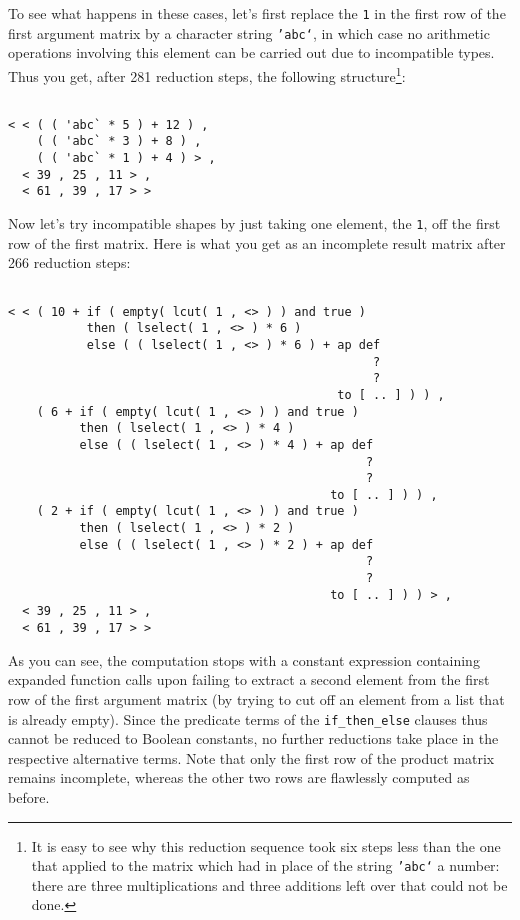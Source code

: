 To see what happens in these cases, let's 
first replace the {\tt 1} in the first row of the first
argument matrix by a character string {\tt 'abc`}, in which case
no arithmetic operations involving this element can be carried
out due to incompatible types. Thus you get, after 281 reduction steps, the following structure\footnote{It is easy to
see why this reduction sequence took six steps less than the
one that applied to the matrix which had in place of the string
{\tt 'abc`} a number: there are three multiplications and three
additions left over that could not be done.}:
\begin{verbatim}

< < ( ( 'abc` * 5 ) + 12 ) ,
    ( ( 'abc` * 3 ) + 8 ) ,
    ( ( 'abc` * 1 ) + 4 ) > ,
  < 39 , 25 , 11 > ,
  < 61 , 39 , 17 > >

\end{verbatim}

Now let's try incompatible shapes by just taking one element, the {\tt 1}, off the
 first row of the first matrix. Here is what you get as an
incomplete result matrix after 266 reduction steps:
\begin{verbatim}

< < ( 10 + if ( empty( lcut( 1 , <> ) ) and true )
           then ( lselect( 1 , <> ) * 6 )
           else ( ( lselect( 1 , <> ) * 6 ) + ap def 
                                                   ?
                                                   ? 
                                              to [ .. ] ) ) ,
    ( 6 + if ( empty( lcut( 1 , <> ) ) and true )
          then ( lselect( 1 , <> ) * 4 )
          else ( ( lselect( 1 , <> ) * 4 ) + ap def 
                                                  ?
                                                  ?
                                             to [ .. ] ) ) ,
    ( 2 + if ( empty( lcut( 1 , <> ) ) and true )
          then ( lselect( 1 , <> ) * 2 )
          else ( ( lselect( 1 , <> ) * 2 ) + ap def 
                                                  ?
                                                  ?
                                             to [ .. ] ) ) > ,
  < 39 , 25 , 11 > ,
  < 61 , 39 , 17 > >

\end{verbatim}
As you can see, the computation stops with a constant expression
containing expanded function calls upon failing to extract a
 second element from the first row of the first argument matrix
(by trying to cut off an element from a list that is already 
empty). Since the predicate terms of the {\tt if\_then\_else}
clauses thus cannot be reduced to Boolean constants, no further
reductions take place in the respective alternative terms.
Note that only the first row of the product matrix remains 
incomplete, whereas the other two rows are flawlessly computed
as before.

